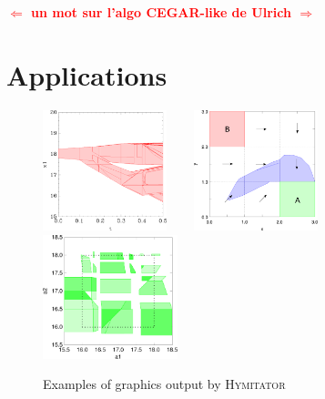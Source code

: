 \documentclass{llncs}
\newcommand{\hymitator}{\textsc{Hymitator}}
\newcommand{\commentaire}[1]{\textcolor{red}{\textbf{$\Leftarrow$  #1 $\Rightarrow$}}}
\begin{document}
\commentaire{un mot sur l'algo CEGAR-like de Ulrich}



\section{Applications}



\begin{figure}[ht!]
	\centering
		\includegraphics[width=3.6cm]{plot_t_x1} \ \ \ 
		\includegraphics[width=3.6cm]{navigation_map.pdf} \ \ \ 
		\includegraphics[height=3.6cm]{rhb_cart2.pdf}
	\caption{Examples of graphics output by \hymitator{}}
	\label{fig:plot_rhb}
\end{figure}
\end{document}
